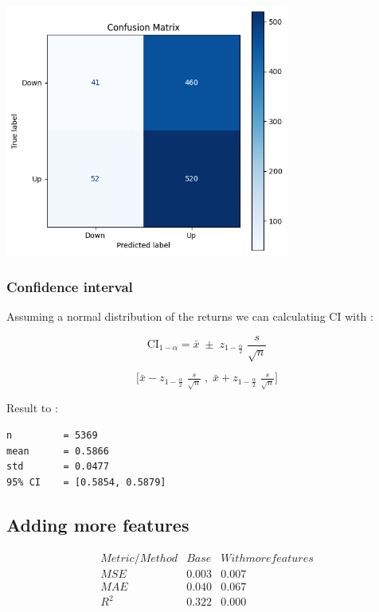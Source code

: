 \documentclass[letterpaper,11pt]{article}
\begin{document}
\begin{center}
\includegraphics[width=0.7\textwidth]{img/conf_mat_price.png}
\end{center}

\bigskip

\subsubsection*{Confidence interval}
Assuming a normal distribution of the returns we can calculating CI with :

\[
\mathrm{CI}_{1-\alpha}
= \bar{x} \;\pm\; z_{1-\frac{\alpha}{2}}\;\frac{s}{\sqrt{n}}
\]

\[
\bigl[
\bar{x} - z_{1-\frac{\alpha}{2}}\;\tfrac{s}{\sqrt{n}}
\;,\;
\bar{x} + z_{1-\frac{\alpha}{2}}\;\tfrac{s}{\sqrt{n}}
\bigr]
\]


Result to :
\begin{verbatim}
n         = 5369
mean      = 0.5866
std       = 0.0477
95% CI    = [0.5854, 0.5879]
\end{verbatim}


\bigskip

\subsection*{Adding more features}

\bigskip
\[
\begin{array}{ccc}
Metric/Method & Base & With more features \\
\hline
MSE & 0.003 & 0.007\\
MAE & 0.040 & 0.067 \\
R^{2} & 0.322 & 0.000 
\end{array}
\]
\bigskip
\end{document}
